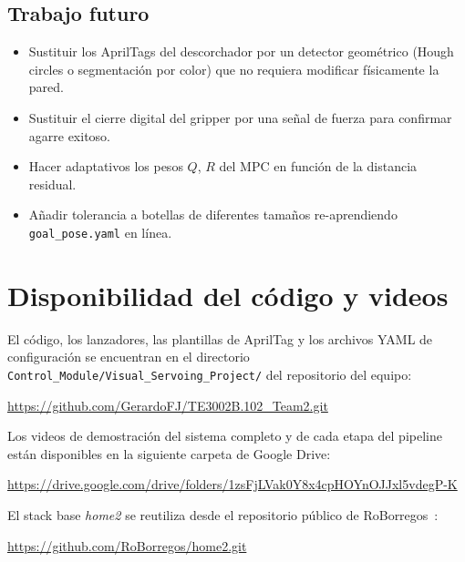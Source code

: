 \documentclass[conference]{IEEEtran}
\begin{document}
\subsection*{Trabajo futuro}
\begin{itemize}
  \item Sustituir los AprilTags del descorchador por un detector
        geom\'etrico (Hough circles o segmentaci\'on por color) que
        no requiera modificar f\'isicamente la pared.
  \item Sustituir el cierre digital del gripper por una se\~nal de
        fuerza para confirmar agarre exitoso.
  \item Hacer adaptativos los pesos $Q$, $R$ del MPC en funci\'on de
        la distancia residual.
  \item A\~nadir tolerancia a botellas de diferentes tama\~nos
        re-aprendiendo \texttt{goal\_pose.yaml} en l\'inea.
\end{itemize}

\section*{Disponibilidad del c\'odigo y videos}

El c\'odigo, los lanzadores, las plantillas de AprilTag y los archivos
YAML de configuraci\'on se encuentran en el directorio
\texttt{Control\_Module/Visual\_Servoing\_Project/} del repositorio
del equipo:
\begin{center}
\url{https://github.com/GerardoFJ/TE3002B.102_Team2.git}
\end{center}

Los videos de demostraci\'on del sistema completo y de cada etapa del
pipeline est\'an disponibles en la siguiente carpeta de Google Drive:
\begin{center}
\url{https://drive.google.com/drive/folders/1zsFjLVak0Y8x4cpHOYnOJJxl5vdegP-K}
\end{center}

El stack base \emph{home2} se reutiliza desde el repositorio p\'ublico
de RoBorregos~\cite{roborregos-home2}:
\begin{center}
\url{https://github.com/RoBorregos/home2.git}
\end{center}
\end{document}
